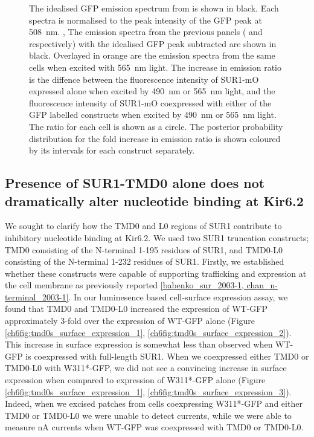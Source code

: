 \begin{figure}[h]
{	The idealised GFP emission spectrum from  is shown in black.
	Each spectra is normalised to the peak intensity of the GFP peak at \SI{508}{\nano\metre}.
	,  The emission spectra from the previous panels ( and  respectively) with the idealised GFP peak subtracted are shown in black.
	Overlayed in orange are the emission spectra from the same cells when excited with \SI{565}{\nano\metre} light.
	 The increase in emission ratio is the diffence between the fluorescence intensity of SUR1-mO expressed alone when excited by \SI{490}{\nano\metre} or \SI{565}{\nano\metre} light, and the fluorescence intensity of SUR1-mO coexpressed with either of the GFP labelled constructs when excited by \SI{490}{\nano\metre} or \SI{565}{\nano\metre} light.
	The ratio for each cell is shown as a circle.
	The posterior probability distribution for the fold increase in emission ratio is shown coloured by its intervals for each construct separately.
	}\label{ch6fig:sur_assays}
\end{figure}

\subsection{Presence of SUR1-TMD0 alone does not dramatically alter nucleotide binding at Kir6.2}

We sought to clarify how the TMD0 and L0 regions of SUR1 contribute to inhibitory nucleotide binding at Kir6.2.
We used two SUR1 truncation constructs; TMD0 consisting of the N-terminal 1-195 residues of SUR1, and TMD0-L0 consisting of the N-terminal 1-232 residues of SUR1.
Firstly, we established whether these constructs were capable of supporting trafficking and expression at the cell membrane as previously reported \ref{babenko_sur_2003-1, chan_n-terminal_2003-1}.
In our luminesence based cell-surface expression assay, we found that TMD0 and TMD0-L0 increased the expression of WT-GFP approximately 3-fold over the expression of WT-GFP alone (Figure \ref{ch6fig:tmd0s_surface_expression_1}, \ref{ch6fig:tmd0s_surface_expression_2}).
This increase in surface expression is somewhat less than observed when WT-GFP is coexpressed with full-length SUR1.
When we coexpressed either TMD0 or TMD0-L0 with W311*-GFP, we did not see a convincing increase in surface expression when compared to expression of W311*-GFP alone (Figure \ref{ch6fig:tmd0s_surface_expression_1}, \ref{ch6fig:tmd0s_surface_expression_3}).
Indeed, when we excised patches from cells coexpressing W311*-GFP and either TMD0 or TMD0-L0 we were unable to detect currents, while we were able to measure \si{\nano\ampere} currents when WT-GFP was coexpressed with TMD0 or TMD0-L0.


